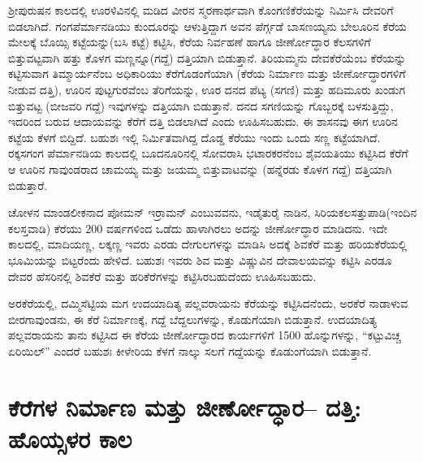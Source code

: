 ಶ‍್ರೀಪುರುಷನ ಕಾಲದಲ್ಲಿ ಊರಳಿವಿನಲ್ಲಿ ಮಡಿದ ವೀರನ ಸ್ಮರಣಾರ್ಥವಾಗಿ ಕೊಂಗಣಿಕೆರೆಯನ್ನು ನಿರ್ಮಿಸಿ ದೇವರಿಗೆ ಬಿಡಲಾಗಿದೆ. ಗಂಗಪೆರ್ಮಾನಡಿಯು ಕುಂದೂರನ್ನು ಆಳುತ್ತಿದ್ದಾಗ ಅವನ ಪೆರ್ಗ್ಗಡೆ ಬಾಸಣಯ್ಯನು ಬೇಲೂರಿನ ಕೆರೆಯ ಮೇಲಕ್ಕೆ ಬೊಯ್ಸಿ ಕಟ್ಟೆಯನ್ನು(ಬಸಿ ಕಟ್ಟೆ) ಕಟ್ಟಿಸಿ, ಕೆರೆಯ ನಿರ್ವಹಣೆ ಹಾಗೂ ಜೀರ್ಣೋದ್ಧಾರ ಕೆಲಸಗಳಿಗೆ ಬಿತ್ತುವಟ್ಟವಾಗಿ ಹತ್ತು ಕೊಳಗ ಮಣ್ಣನ್ನೂ(ಗದ್ದೆ) ದತ್ತಿಯಾಗಿ ಬಿಡುತ್ತಾನೆ. ತಿರಿಯಮ್ಮನು ದೇವಕೆರೆಯೆಂಬ ಕೆರೆಯನ್ನು ಕಟ್ಟಿಸುವಾಗ ತಿಮ್ಮಾರ್ಯನೆಂಬ ಅಧಿಕಾರಿಯು ಕೆರೆಗೊಡಂಗೆಯಾಗಿ (ಕೆರೆಯ ನಿರ್ಮಾಣ ಮತ್ತು ಜೀರ್ಣೋದ್ಧಾರಗಳಿಗೆ ನೀಡುವ ದತ್ತಿ), ಊರಿನ ಪುಟ್ಟಗುರವೆಂಬ ತೆರಿಗೆಯನ್ನು, ಊರ ದನದ ಪೆಟ್ಯ (ಸಗಣಿ) ಮತ್ತು ಹದಿಮೂರು ಖಂಡುಗ ಬಿತ್ತುವಟ್ಟ (ಬೀಜವರಿ ಗದ್ದೆ) ಇವುಗಳನ್ನು ದತ್ತಿಯಾಗಿ ಬಿಡುತ್ತಾನೆ. ದನದ ಸಗಣಿಯನ್ನು ಗೊಬ್ಬರಕ್ಕೆ ಬಳಸುತ್ತಿದ್ದು, ಇದರಿಂದ ಬರುವ ಆದಾಯವನ್ನು ಕೆರೆಗೆ ದತ್ತಿ ಬಿಡಲಾಗಿದೆ ಎಂದು ಊಹಿಸಬಹುದು. ಈ ಶಾಸನವು ಈಗ ಊರಿನ ಕಟ್ಟೆಯ ಕೆಳಗೆ ಬಿದ್ದಿದೆ. ಬಹುಶಃ ಇಲ್ಲಿ ನಿರ್ಮಿತವಾಗಿದ್ದ ದೊಡ್ಡ ಕೆರೆಯು ಇಂದು ಒಂದು ಸಣ್ಣ ಕಟ್ಟೆಯಾಗಿದೆ. ರಕ್ಕಸಗಂಗ ಪೆರ್ಮಾನಡಿಯ ಕಾಲದಲ್ಲಿ ಬೂದನೂರಿನಲ್ಲಿ ಸೋವರಾಸಿ ಭಟಾರಕರನೆಂಬ ಶೈವಯತಿಯು ಕಟ್ಟಿಸಿದ ಕೆರೆಗೆ ಆ ಊರಿನ ಗಾವುಂಡರಾದ ಚಾಮಯ್ಯ ಮತ್ತು ಜಯಮ್ಮ ಬಿತ್ತುವಾಟವನ್ನು (ಹನ್ನೆರಡು ಕೊಳಗ ಗದ್ದೆ) ದತ್ತಿಯಾಗಿ ಬಿಡುತ್ತಾರೆ.

ಚೋಳನ ಮಾಂಡಲೀಕನಾದ ಪೋಮನ್​ ಇರ್ರಾಮನ್​ ಎಂಬುವವನು, ಇಡೈತುರೈ ನಾಡಿನ, ಸಿರಿಯಕಲಸತ್ತುಪಾಡಿ\break (ಇಂದಿನ ಕಲಸ್ತವಾಡಿ) ಕೆರೆಯು 200 ವರ್ಷಗಳಿಂದ ಒಡೆದು ಹಾಳಾಗಿರಲು ಅದನ್ನು ಜೀರ್ಣೋದ್ಧಾರ ಮಾಡಿದನು. ಇದೇ ಕಾಲದಲ್ಲಿ, ಮಾದಿಯಣ್ಣ, ಲಕ್ಕಣ್ಣ ಇವರು ಎರಡು ದೇಗುಲಗಳನ್ನು ಮಾಡಿಸಿ ಅದಕ್ಕೆ ಶಿವಕೆರೆ ಮತ್ತು ಹರಿಯಕೆರೆಯಲ್ಲಿ ಭೂಮಿಯನ್ನು ಬಿಟ್ಟರೆಂದು ಹೇಳಿದೆ. ಬಹುಶಃ ಇವರು ಶಿವ ಮತ್ತು ವಿಷ್ಣುವಿನ ದೇವಾಲಯವನ್ನು ಕಟ್ಟಿಸಿ ಎರಡೂ ದೇವರ ಹೆಸರಿನಲ್ಲಿ ಶಿವಕೆರೆ ಮತ್ತು ಹರಿಕೆರೆಗಳನ್ನು ಕಟ್ಟಿಸಿರಬಹುದೆಂದು ಊಹಿಸಬಹುದು.

ಅರಕೆರೆಯಲ್ಲಿ, ದಮ್ಮಿಸೆಟ್ಟಿಯ ಮಗ ಉದಯಾದಿತ್ಯ ಪಲ್ಲವರಾಯನು ಕೆರೆಯನ್ನು ಕಟ್ಟಿಸಿದನೆಂದು, ಅರಕೆರೆ ನಾಡಾಳುವ ಬೀರಗಾವುಂಡನು, ಈ ಕೆರೆ ನಿರ್ಮಾಣಕ್ಕೆ, ಗದ್ದೆ ಬೆದ್ದಲುಗಳನ್ನು, ಕೊಡುಗೆಯಾಗಿ ಬಿಡುತ್ತಾನೆ. ಉದಯಾದಿತ್ಯ ಪಲ್ಲವರಾಯನು ತಾನು ಕಟ್ಟಿಸಿದ ಈ ಕೆರೆಯ ಜೀರ್ಣೋದ್ಧಾರದ ಕಾರ್ಯಗಳಿಗೆ 1500 ಹೊನ್ನುಗಳನ್ನು, “ಕಟ್ಟುವಿಚ್ಚ ಏರಿಯಿಲ್​” ಎಂದರೆ ಬಹುಶಃ ಕೀಳೇರಿಯ ಕೆಳಗೆ ನಾಲ್ಕು ಸಲಗೆ ಗದ್ದೆಯನ್ನು ಕೊಡುಂಗೆಯಾಗಿ ಬಿಡುತ್ತಾನೆ.


\section{ಕೆರೆಗಳ ನಿರ್ಮಾಣ ಮತ್ತು ಜೀರ್ಣೋದ್ಧಾರ– ದತ್ತಿ: ಹೊಯ್ಸಳರ ಕಾಲ}


